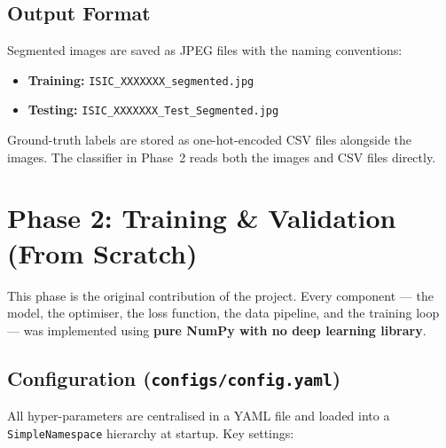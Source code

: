 \documentclass[12pt,a4paper]{report}
\begin{document}
\section{Output Format}

Segmented images are saved as JPEG files with the naming conventions:
\begin{itemize}[nosep]
  \item \textbf{Training:} \texttt{ISIC\_XXXXXXX\_segmented.jpg}
  \item \textbf{Testing:} \texttt{ISIC\_XXXXXXX\_Test\_Segmented.jpg}
\end{itemize}
Ground-truth labels are stored as one-hot-encoded CSV files alongside the images. The classifier in Phase~2 reads both the images and CSV files directly.

\chapter{Phase 2: Training \& Validation (From Scratch)}
\label{ch:training}

This phase is the original contribution of the project. Every component — the model, the optimiser, the loss function, the data pipeline, and the training loop — was implemented using \textbf{pure NumPy with no deep learning library}.

\section{Configuration (\texttt{configs/config.yaml})}

All hyper-parameters are centralised in a YAML file and loaded into a \texttt{SimpleNamespace} hierarchy at startup. Key settings:
\end{document}
